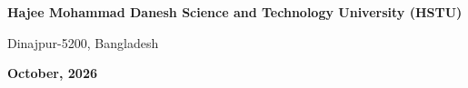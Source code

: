 \begin{titlepage}
\begin{singlespace}
\begin{center}
    {\fontsize{13pt}{16pt}\selectfont \textbf{Hajee Mohammad Danesh Science and Technology University (HSTU)} \par}
    \vspace{0.12cm}
    {\fontsize{11pt}{14pt}\selectfont Dinajpur-5200, Bangladesh \par}
    
    \vspace{0.4cm}
    {\fontsize{12pt}{15pt}\selectfont \textbf{October, 2026} \par}
    
\end{center}
\end{singlespace}
\end{titlepage}
